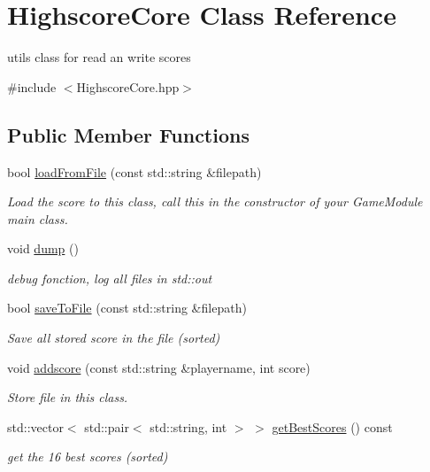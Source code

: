 \hypertarget{class_highscore_core}{}\section{Highscore\+Core Class Reference}
\label{class_highscore_core}


utils class for read an write scores  




{\ttfamily \#include $<$Highscore\+Core.\+hpp$>$}

\subsection*{Public Member Functions}
\begin{DoxyCompactItemize}
\item 
bool \hyperlink{class_highscore_core_a5c0000d4513844f8c37e3b8f6f359219}{load\+From\+File} (const std\+::string \&filepath)
\begin{DoxyCompactList}\small\item\em Load the score to this class, call this in the constructor of your Game\+Module main class. \end{DoxyCompactList}\item 
\mbox{\label{class_highscore_core_a92f6f400c71a9a9546a7a1d2b6f04468}} 
void \hyperlink{class_highscore_core_a92f6f400c71a9a9546a7a1d2b6f04468}{dump} ()
\begin{DoxyCompactList}\small\item\em debug fonction, log all files in std\+::out \end{DoxyCompactList}\item 
bool \hyperlink{class_highscore_core_a7a86c95f26a7b0d527f639f94bf96301}{save\+To\+File} (const std\+::string \&filepath)
\begin{DoxyCompactList}\small\item\em Save all stored score in the file (sorted) \end{DoxyCompactList}\item 
void \hyperlink{class_highscore_core_a12de8f889c9990f769245fc967caa129}{addscore} (const std\+::string \&playername, int score)
\begin{DoxyCompactList}\small\item\em Store file in this class. \end{DoxyCompactList}\item 
std\+::vector$<$ std\+::pair$<$ std\+::string, int $>$ $>$ \hyperlink{class_highscore_core_a8d80890801631184899061cdd3e5dcbe}{get\+Best\+Scores} () const
\begin{DoxyCompactList}\small\item\em get the 16 best scores (sorted) \end{DoxyCompactList}\end{DoxyCompactItemize}
